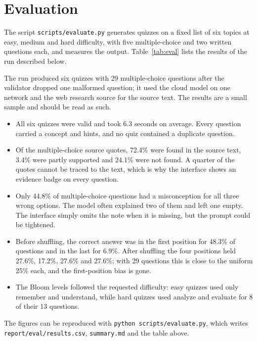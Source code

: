 \section{Evaluation}
\label{sec:eval}
The script \texttt{scripts/evaluate.py} generates quizzes on a fixed list of six topics at easy, medium and hard difficulty, with five multiple-choice and two written questions each, and measures the output. Table~\ref{tab:eval} lists the results of the run described below.

\begin{table}[H]
\centering

\caption{Measured quiz quality}
\label{tab:eval}
\end{table}

The run produced six quizzes with 29 multiple-choice questions after the validator dropped one malformed question; it used the cloud model on one network and the web research source for the source text. The results are a small sample and should be read as such.
\begin{itemize}
\item All six quizzes were valid and took 6.3 seconds on average. Every question carried a concept and hints, and no quiz contained a duplicate question.
\item Of the multiple-choice source quotes, 72.4\% were found in the source text, 3.4\% were partly supported and 24.1\% were not found. A quarter of the quotes cannot be traced to the text, which is why the interface shows an evidence badge on every question.
\item Only 44.8\% of multiple-choice questions had a misconception for all three wrong options. The model often explained two of them and left one empty. The interface simply omits the note when it is missing, but the prompt could be tightened.
\item Before shuffling, the correct answer was in the first position for 48.3\% of questions and in the last for 6.9\%. After shuffling the four positions held 27.6\%, 17.2\%, 27.6\% and 27.6\%; with 29 questions this is close to the uniform 25\% each, and the first-position bias is gone.
\item The Bloom levels followed the requested difficulty: easy quizzes used only remember and understand, while hard quizzes used analyze and evaluate for 8 of their 13 questions.
\end{itemize}
The figures can be reproduced with \texttt{python scripts/evaluate.py}, which writes \texttt{report/eval/results.csv}, \texttt{summary.md} and the table above.

